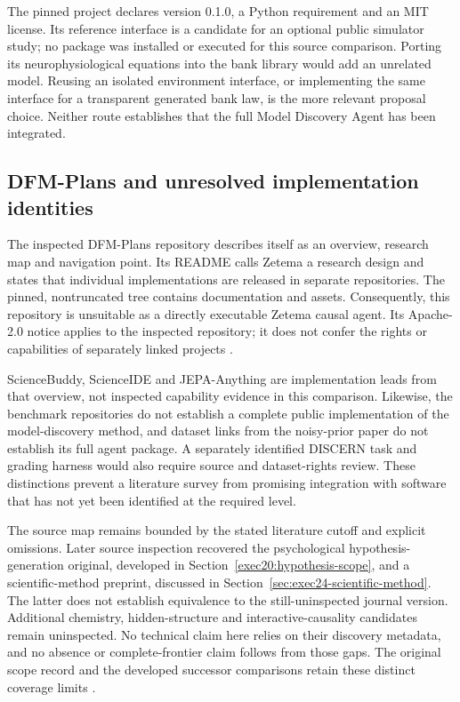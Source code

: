 The pinned project declares version 0.1.0, a Python requirement and an MIT
license. Its reference interface is a candidate for an optional public
simulator study; no package was installed or executed for this source
comparison. Porting its neurophysiological equations into the bank library
would add an unrelated model. Reusing an isolated environment interface, or
implementing the same interface for a transparent generated bank law, is the
more relevant proposal choice. Neither route establishes that the full
Model Discovery Agent has been integrated.

\subsection{DFM-Plans and unresolved implementation identities}

The inspected DFM-Plans repository describes itself as an overview, research
map and navigation point. Its README calls Zetema a research design and
states that individual implementations are released in separate repositories.
The pinned, nontruncated tree contains documentation and assets. Consequently,
this repository is unsuitable as a directly executable Zetema causal agent.
Its Apache-2.0 notice applies to the inspected repository; it does not confer
the rights or capabilities of separately linked projects
\cite{exec13_active_dfmplans}.

ScienceBuddy, ScienceIDE and JEPA-Anything are implementation leads from that
overview, not inspected capability evidence in this comparison. Likewise,
the benchmark repositories do not establish a complete public implementation
of the model-discovery method, and dataset links from the noisy-prior paper
do not establish its full agent package. A separately identified DISCERN
task and grading harness would also require source and dataset-rights review.
These distinctions prevent a literature survey from promising integration
with software that has not yet been identified at the required level.

The source map remains bounded by the stated literature cutoff and explicit
omissions. Later source inspection recovered the psychological
hypothesis-generation original, developed in
Section~\ref{exec20:hypothesis-scope}, and a scientific-method preprint,
discussed in Section~\ref{sec:exec24-scientific-method}. The latter does not
establish equivalence to the still-uninspected journal version. Additional
chemistry, hidden-structure and interactive-causality candidates remain
uninspected. No technical claim here relies on their discovery metadata, and
no absence or complete-frontier claim follows from those gaps. The original
scope record and the developed successor comparisons retain these distinct
coverage limits
\cite{exec13_active_scope}.

